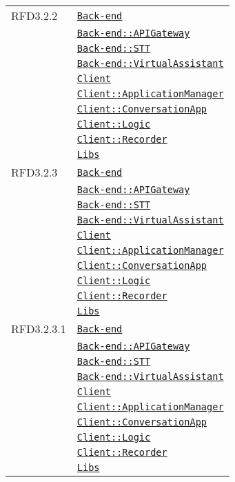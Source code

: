 \begin{longtable}{|>{\centering}m{3cm}|m{10cm}<{\centering}|}
RFD3.2.2 & \hyperref[Back-end]{\texttt{Back-end}}\\
& \hyperref[Back-end::APIGateway]{\texttt{Back-end::APIGateway}}\\
& \hyperref[Back-end::STT]{\texttt{Back-end::STT}}\\
& \hyperref[Back-end::VirtualAssistant]{\texttt{Back-end::VirtualAssistant}}\\
& \hyperref[Client]{\texttt{Client}}\\
& \hyperref[Client::ApplicationManager]{\texttt{Client::ApplicationManager}}\\
& \hyperref[Client::ConversationApp]{\texttt{Client::ConversationApp}}\\
& \hyperref[Client::Logic]{\texttt{Client::Logic}}\\
& \hyperref[Client::Recorder]{\texttt{Client::Recorder}}\\
& \hyperref[Libs]{\texttt{Libs}}\\ \hline

RFD3.2.3 & \hyperref[Back-end]{\texttt{Back-end}}\\
& \hyperref[Back-end::APIGateway]{\texttt{Back-end::APIGateway}}\\
& \hyperref[Back-end::STT]{\texttt{Back-end::STT}}\\
& \hyperref[Back-end::VirtualAssistant]{\texttt{Back-end::VirtualAssistant}}\\
& \hyperref[Client]{\texttt{Client}}\\
& \hyperref[Client::ApplicationManager]{\texttt{Client::ApplicationManager}}\\
& \hyperref[Client::ConversationApp]{\texttt{Client::ConversationApp}}\\
& \hyperref[Client::Logic]{\texttt{Client::Logic}}\\
& \hyperref[Client::Recorder]{\texttt{Client::Recorder}}\\
& \hyperref[Libs]{\texttt{Libs}}\\ \hline

RFD3.2.3.1 & \hyperref[Back-end]{\texttt{Back-end}}\\
& \hyperref[Back-end::APIGateway]{\texttt{Back-end::APIGateway}}\\
& \hyperref[Back-end::STT]{\texttt{Back-end::STT}}\\
& \hyperref[Back-end::VirtualAssistant]{\texttt{Back-end::VirtualAssistant}}\\
& \hyperref[Client]{\texttt{Client}}\\
& \hyperref[Client::ApplicationManager]{\texttt{Client::ApplicationManager}}\\
& \hyperref[Client::ConversationApp]{\texttt{Client::ConversationApp}}\\
& \hyperref[Client::Logic]{\texttt{Client::Logic}}\\
& \hyperref[Client::Recorder]{\texttt{Client::Recorder}}\\
& \hyperref[Libs]{\texttt{Libs}}\\ \hline


\end{longtable}
